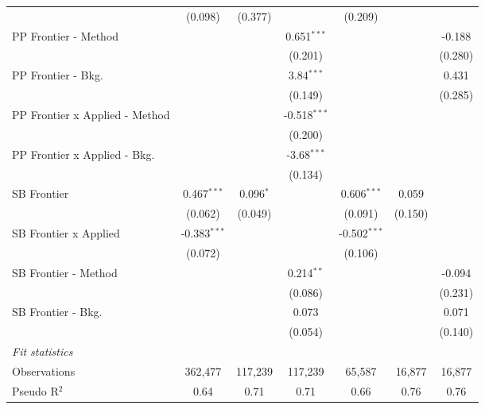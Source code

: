 \begin{tabular}{lcccccc}
                                  & (0.098)        & (0.377)       &                & (0.209)        &              &   \\   
   PP Frontier - Method           &                &               & 0.651$^{***}$  &                &              & -0.188\\   
                                  &                &               & (0.201)        &                &              & (0.280)\\   
   PP Frontier - Bkg.             &                &               & 3.84$^{***}$   &                &              & 0.431\\   
                                  &                &               & (0.149)        &                &              & (0.285)\\   
   PP Frontier x Applied - Method &                &               & -0.518$^{***}$ &                &              &   \\   
                                  &                &               & (0.200)        &                &              &   \\   
   PP Frontier x Applied - Bkg.   &                &               & -3.68$^{***}$  &                &              &   \\   
                                  &                &               & (0.134)        &                &              &   \\   
   SB Frontier                    & 0.467$^{***}$  & 0.096$^{*}$   &                & 0.606$^{***}$  & 0.059        &   \\   
                                  & (0.062)        & (0.049)       &                & (0.091)        & (0.150)      &   \\   
   SB Frontier x Applied          & -0.383$^{***}$ &               &                & -0.502$^{***}$ &              &   \\   
                                  & (0.072)        &               &                & (0.106)        &              &   \\   
   SB Frontier - Method           &                &               & 0.214$^{**}$   &                &              & -0.094\\   
                                  &                &               & (0.086)        &                &              & (0.231)\\   
   SB Frontier - Bkg.             &                &               & 0.073          &                &              & 0.071\\   
                                  &                &               & (0.054)        &                &              & (0.140)\\   
   \midrule
   \emph{Fit statistics}\\
   Observations                   & 362,477        & 117,239       & 117,239        & 65,587         & 16,877       & 16,877\\  
   Pseudo R$^2$                   & 0.64           & 0.71          & 0.71           & 0.66           & 0.76         & 0.76\\  
   

\end{tabular}
